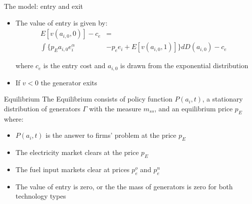 \documentclass{beamer}
\begin{document}
\begin{frame}{The model: entry and exit}
\begin{itemize}
    \item The value of entry is given by: 
    \begin{equation*}
    \begin{aligned} 
    E[v(a_{i,0},0)]-c_{e}&=\\\int \big\{ p_Ea_{i,0} e_i^\alpha &-p_e e_i+E[v(a_{i,0},1)] \big\} dD(a_{i,0})-c_{e}
\end{aligned}
    \end{equation*}
    
where $c_{e}$ is the entry cost and $a_{i,0}$ is drawn from the exponential distribution
\hfill \break
    \item If $v<0$ the generator exits
\end{itemize}
    
\end{frame}
\begin{frame}{Equilibrium}
The Equilibrium consists of policy function $P(a_i,t)$, a stationary distribution of generators $\Gamma$ with the measure $m_{ss}$, and an equilibrium price $p_E$ where:
    \begin{itemize}
        \item  $P(a_i,t)$ is the answer to firms' problem at the price $p_E$
        \item The electricity market clears at the price $p_E$ 
        \item The fuel input markets clear at prices $p_e^o$ and $p_e^n$
        \item The value of entry is zero, or the the mass of generators is zero for both technology types
    \end{itemize}
     \hyperlink{alt_model}{} 
\end{frame}



\end{document}
